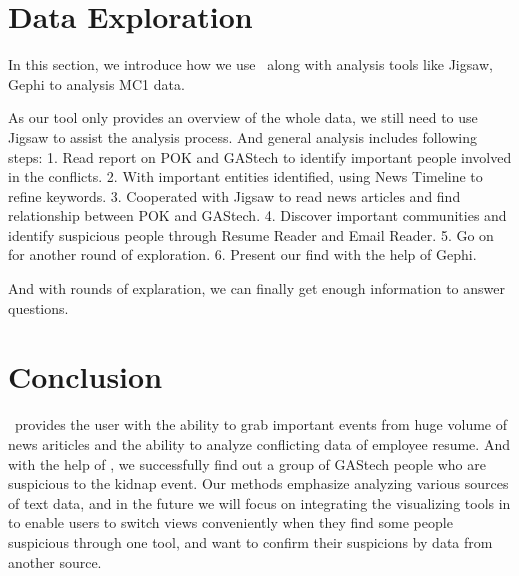 \documentclass{vgtc}                          %
\begin{document}
\section{Data Exploration}
In this section, we introduce how we use \projectname\ along with analysis tools like Jigsaw, Gephi to analysis MC1 data.
\par
As our tool only provides an overview of the whole data, we still need to use Jigsaw to assist the analysis process. And general analysis includes following steps:
1. Read report on POK and GAStech to identify important people involved in the conflicts.
2. With important entities identified, using News Timeline to refine keywords.
3. Cooperated with Jigsaw to read news articles and find relationship between POK and GAStech.
4. Discover important communities and identify suspicious people through Resume Reader and Email Reader.
5. Go on for another round of exploration.
6. Present our find with the help of Gephi.
\par
And with rounds of explaration, we can finally get enough information to answer questions.

\section{Conclusion}
\projectname\ provides the user with the ability to grab important events from huge volume of news ariticles and the ability to analyze conflicting data of employee resume. And with the help of \projectname, we successfully find out a group of GAStech people who are suspicious to the kidnap event. Our methods emphasize analyzing various sources of text data, and in the future we will focus on integrating the visualizing tools in \projectname to enable users to switch views conveniently when they find some people suspicious through one tool, and want to confirm their suspicions by data from another source.



\end{document}
